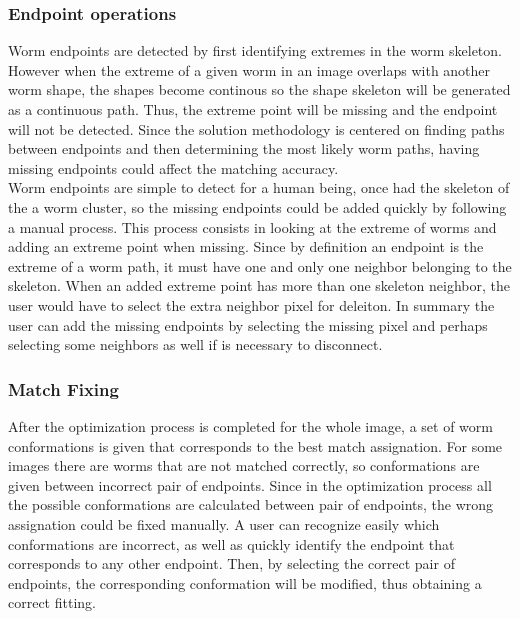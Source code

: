\subsubsection{Endpoint operations}
\label{sec:endpointop}

Worm endpoints are detected by first identifying extremes in the worm
skeleton. However when the extreme of a given worm in an image overlaps with 
another worm shape, the shapes become continous so the shape skeleton will be generated 
as a continuous path. Thus, the extreme point will be missing and the endpoint will not be 
detected. Since the solution methodology is centered on finding paths between endpoints and 
then determining the most likely worm paths, having missing endpoints could affect 
the matching accuracy.\\

Worm endpoints are simple to detect for a human being, once had the skeleton of the 
a worm cluster, so the missing endpoints could be added quickly by following a manual
process. This process consists in looking at the extreme of worms and adding an 
extreme point when missing. Since by definition an endpoint is the extreme of a worm path,
it must have one and only one neighbor belonging to the skeleton. When an added extreme
point has more than one skeleton neighbor, the user would have to select the extra
neighbor pixel for deleiton.
In summary the user can add the missing endpoints by selecting the missing pixel
and perhaps selecting some neighbors as well if is necessary to disconnect. 

\subsubsection{Match Fixing}
\label{sec:matchfix}

After the optimization process is completed for the whole image, a set of 
worm conformations is given that corresponds to the best match assignation.
For some images there are worms that are not matched correctly, so 
conformations are given between incorrect pair of endpoints. 
Since in the optimization process all the possible conformations are calculated
between pair of endpoints, the wrong assignation could be fixed manually. A user
can recognize easily which conformations are incorrect, as well as quickly 
identify the endpoint that corresponds to any other endpoint. Then, by selecting 
the correct pair of endpoints, the corresponding
conformation will be modified, thus obtaining a correct fitting.



